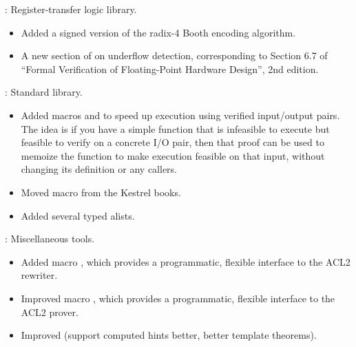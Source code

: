 
\begin{frame}

\implibtitle

:
Register-transfer logic library.
\begin{itemize}
\item Added a signed version of the radix-4 Booth encoding algorithm.
\item A new section of  on
      underflow detection, corresponding to Section 6.7 of ``Formal
      Verification of Floating-Point Hardware Design'', 2nd edition.
\end{itemize}

\end{frame}


\begin{frame}

\implibtitle

:
Standard library.
\begin{itemize}
\item Added macros  and 
      to speed up execution using verified input/output pairs.
      The idea is if you have a simple function that is infeasible to
      execute but feasible to verify on a concrete I/O pair,
      then that proof can be used to memoize the function to make execution
      feasible on that input, without changing its definition or any callers.
\item Moved macro  from the Kestrel books.
\item Added several typed alists.
\end{itemize}

\end{frame}


\begin{frame}

\implibtitle

:
Miscellaneous tools.
\begin{itemize}
\item Added macro ,
      which provides a programmatic, flexible interface
      to the ACL2 rewriter.
\item Improved macro ,
      which provides a programmatic, flexible interface
      to the ACL2 prover.
\item Improved  (support computed hints better,
      better template theorems).
\end{itemize}
\end{frame}



